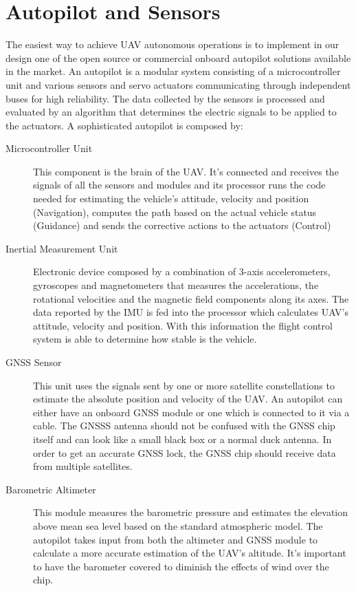 \documentclass[english,fira]{ist-report}
\begin{document}
\section{Autopilot and Sensors}

The easiest way to achieve UAV autonomous operations is to implement in our design one of the open source or commercial onboard autopilot solutions available in the market. An autopilot is a modular system consisting of a microcontroller unit and various sensors and servo actuators communicating through independent buses for high reliability. The data collected by the sensors is processed and evaluated by an algorithm that determines the electric signals to be applied to the actuators. A sophisticated autopilot is composed by:
\begin{description}
	\item[Microcontroller Unit] This component is the brain of the UAV. It's connected and receives the signals of all the sensors and modules and its processor runs the code needed for estimating the vehicle's attitude, velocity and position (Navigation), computes the path based on the actual vehicle status (Guidance) and sends the corrective actions to the actuators (Control)
	\item[Inertial Measurement Unit] Electronic device composed by a combination of 3-axis accelerometers, gyroscopes and magnetometers that measures the accelerations, the rotational velocities and the magnetic field components along its axes. The data reported by the IMU is fed into the processor which calculates UAV's attitude, velocity and position. With this information the flight control system is able to determine how stable is the vehicle. 
	\item[GNSS Sensor] This unit uses the signals sent by one or more satellite constellations to estimate the absolute position and velocity of the UAV. An autopilot can either have an onboard GNSS module or one which is connected to it via a cable. The GNSSS antenna should not be confused with the GNSS chip itself and can look like a small black box or a normal duck antenna. In order to get an accurate GNSS lock, the GNSS chip should receive data from multiple satellites. 
	\item[Barometric Altimeter] This module measures the barometric pressure and estimates the elevation above mean sea level based on the standard atmospheric model. The autopilot takes input from both the altimeter and GNSS module to calculate a more accurate estimation of the UAV's altitude. It's important to have the barometer covered to diminish the effects of wind over the chip. 

\end{description}
\end{document}

